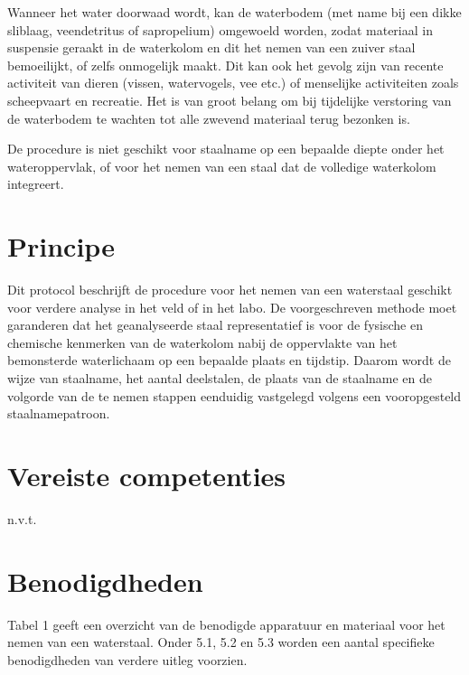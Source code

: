 \documentclass[
]{scrreprt}
\begin{document}
Wanneer het water doorwaad wordt, kan de waterbodem (met name bij een dikke sliblaag, veendetritus of sapropelium) omgewoeld worden, zodat materiaal in suspensie geraakt in de waterkolom en dit het nemen van een zuiver staal bemoeilijkt, of zelfs onmogelijk maakt. Dit kan ook het gevolg zijn van recente activiteit van dieren (vissen, watervogels, vee etc.) of menselijke activiteiten zoals scheepvaart en recreatie. Het is van groot belang om bij tijdelijke verstoring van de waterbodem te wachten tot alle zwevend materiaal terug bezonken is.

De procedure is niet geschikt voor staalname op een bepaalde diepte onder het wateroppervlak, of voor het nemen van een staal dat de volledige waterkolom integreert.

\chapter{Principe}\label{principe}

Dit protocol beschrijft de procedure voor het nemen van een waterstaal geschikt voor verdere analyse in het veld of in het labo. De voorgeschreven methode moet garanderen dat het geanalyseerde staal representatief is voor de fysische en chemische kenmerken van de waterkolom nabij de oppervlakte van het bemonsterde waterlichaam op een bepaalde plaats en tijdstip. Daarom wordt de wijze van staalname, het aantal deelstalen, de plaats van de staalname en de volgorde van de te nemen stappen eenduidig vastgelegd volgens een vooropgesteld staalnamepatroon.

\chapter{Vereiste competenties}\label{vereiste-competenties}

n.v.t.

\chapter{Benodigdheden}\label{benodigdheden}

Tabel 1 geeft een overzicht van de benodigde apparatuur en materiaal voor het nemen van een waterstaal. Onder 5.1, 5.2 en 5.3 worden een aantal specifieke benodigdheden van verdere uitleg voorzien.
\end{document}
